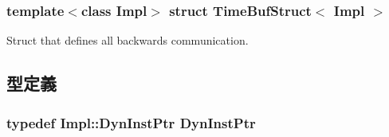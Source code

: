 \subsubsection*{template$<$class Impl$>$ struct TimeBufStruct$<$ Impl $>$}

Struct that defines all backwards communication. 

\subsection{型定義}
\hypertarget{structTimeBufStruct_a028ce10889c5f6450239d9e9a7347976}{
\subsubsection[{DynInstPtr}]{\setlength{\rightskip}{0pt plus 5cm}typedef Impl::DynInstPtr {\bf DynInstPtr}}}
\label{structTimeBufStruct_a028ce10889c5f6450239d9e9a7347976}


